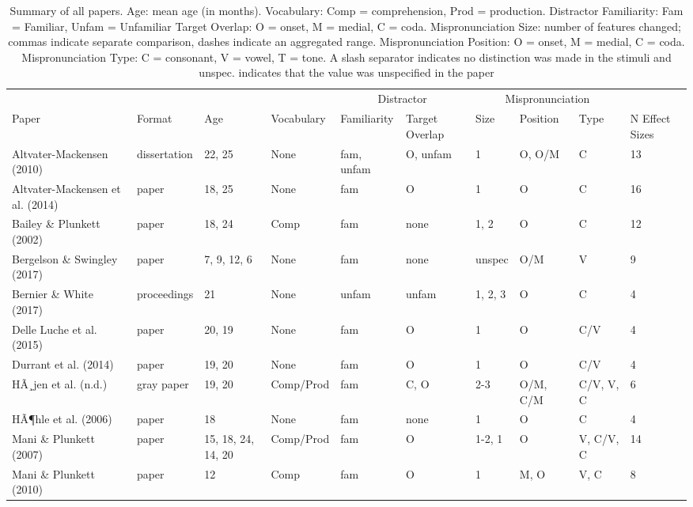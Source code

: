 \documentclass[man, noextraspace]{apa6}
\makeatletter
\newenvironment{lltable}{\begin{landscape}\begin{center}\begin{ThreePartTable}}{\end{ThreePartTable}\end{center}\end{landscape}}
\newcommand\LastLTentrywidth{1em}
\newlength\longtablewidth
\newcommand{\getlongtablewidth}{\begingroup \ifcsname LT@\roman{LT@tables}\endcsname \global\longtablewidth=0pt \renewcommand{\LT@entry}[2]{\global\advance\longtablewidth by ##2\relax\gdef\LastLTentrywidth{##2}}\@nameuse{LT@\roman{LT@tables}} \fi \endgroup}
\makeatother
\begin{document}
\begin{lltable}


\scriptsize{
\begin{longtable}{llllllllll}\noalign{\getlongtablewidth\global\LTcapwidth=\longtablewidth}
\caption{\label{tab:SummaryTable}Summary of all papers. Age: mean age (in months). Vocabulary: Comp = comprehension, Prod = production. Distractor Familiarity: Fam = Familiar, Unfam = Unfamiliar  Target Overlap: O = onset, M = medial, C = coda. Mispronunciation Size: number of features changed; commas indicate separate comparison, dashes indicate an aggregated range. Mispronunciation Position: O = onset, M = medial, C = coda. Mispronunciation Type: C = consonant, V = vowel, T = tone. A slash separator indicates no distinction was made in the stimuli and unspec. indicates that the value was unspecified in the paper}\\
\toprule
 &  &  &  & \multicolumn{2}{c}{Distractor} & \multicolumn{3}{c}{Mispronunciation}  &\\
\cmidrule(r){5-6} \cmidrule(r){7-9}
Paper & Format & Age & Vocabulary & Familiarity & Target Overlap & Size & Position & Type & N Effect Sizes\\
\midrule
Altvater-Mackensen (2010) & dissertation & 22, 25 & None & fam, unfam & O, unfam & 1 & O, O/M & C & 13\\
Altvater-Mackensen et al. (2014) & paper & 18, 25 & None & fam & O & 1 & O & C & 16\\
Bailey \& Plunkett (2002) & paper & 18, 24 & Comp & fam & none & 1, 2 & O & C & 12\\
Bergelson \& Swingley (2017) & paper & 7, 9, 12, 6 & None & fam & none & unspec & O/M & V & 9\\
Bernier \& White (2017) & proceedings & 21 & None & unfam & unfam & 1, 2, 3 & O & C & 4\\
Delle Luche et al. (2015) & paper & 20, 19 & None & fam & O & 1 & O & C/V & 4\\
Durrant et al. (2014) & paper & 19, 20 & None & fam & O & 1 & O & C/V & 4\\
HÃ¸jen et al. (n.d.) & gray paper & 19, 20 & Comp/Prod & fam & C, O & 2-3 & O/M, C/M & C/V, V, C & 6\\
HÃ¶hle et al. (2006) & paper & 18 & None & fam & none & 1 & O & C & 4\\
Mani \& Plunkett (2007) & paper & 15, 18, 24, 14, 20 & Comp/Prod & fam & O & 1-2, 1 & O & V, C/V, C & 14\\
Mani \& Plunkett (2010) & paper & 12 & Comp & fam & O & 1 & M, O & V, C & 8\\

\end{longtable}}
\end{lltable}
\end{document}
